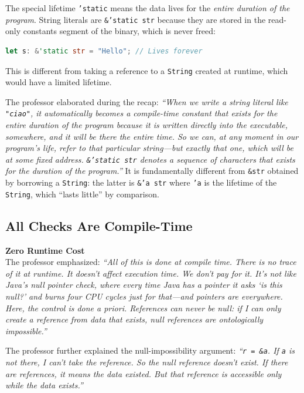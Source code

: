 The special lifetime \texttt{'static} means the data lives for the \emph{entire duration of the program}. String literals are \texttt{\&'static str} because they are stored in the read-only constants segment of the binary, which is never freed:

\begin{lstlisting}[language=Rust]
let s: &'static str = "Hello"; // Lives forever
\end{lstlisting}

This is different from taking a reference to a \texttt{String} created at runtime, which would have a limited lifetime.

The professor elaborated during the recap: \emph{``When we write a string literal like \texttt{"ciao"}, it automatically becomes a compile-time constant that exists for the entire duration of the program because it is written directly into the executable, somewhere, and it will be there the entire time. So we can, at any moment in our program's life, refer to that particular string---but exactly that one, which will be at some fixed address. \texttt{\&'static str} denotes a sequence of characters that exists for the duration of the program.''} It is fundamentally different from \texttt{\&str} obtained by borrowing a \texttt{String}: the latter is \texttt{\&'a str} where \texttt{'a} is the lifetime of the \texttt{String}, which ``lasts little'' by comparison.

\subsection{All Checks Are Compile-Time}

\begin{insightbox}
\textbf{Zero Runtime Cost} \\
The professor emphasized: \emph{``All of this is done at compile time. There is no trace of it at runtime. It doesn't affect execution time. We don't pay for it. It's not like Java's null pointer check, where every time Java has a pointer it asks `is this null?' and burns four CPU cycles just for that---and pointers are everywhere. Here, the control is done a priori. References can never be null: if I can only create a reference from data that exists, null references are ontologically impossible.''}
\end{insightbox}

The professor further explained the null-impossibility argument: \emph{``\texttt{r = \&a}. If \texttt{a} is not there, I can't take the reference. So the null reference doesn't exist. If there are references, it means the data existed. But that reference is accessible only while the data exists.''}

